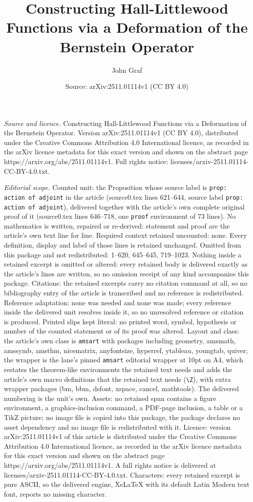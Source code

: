 \documentclass[10pt,a4paper]{amsart}
\title[Constructing Hall-Littlewood Functions via a Deformation of ]{Constructing Hall-Littlewood Functions via a Deformation of the Bernstein Operator}
\author{John Graf}
\date{Source: arXiv:2511.01114v1 (CC BY 4.0)}
\begin{document}
\maketitle

\noindent\emph{Source and licence.} Constructing Hall-Littlewood Functions via a Deformation of the Bernstein Operator. Version arXiv:2511.01114v1 (CC BY 4.0), distributed under the Creative Commons Attribution 4.0 International licence, as recorded in the arXiv licence metadata for this exact version and shown on the abstract page https://arxiv.org/abs/2511.01114v1. Full rights notice: licenses/arxiv-2511.01114-CC-BY-4.0.txt.\par\smallskip

\noindent\textit{Editorial scope.} Counted unit: the Proposition whose source label is \texttt{prop: action of adjoint} in the article (source0.tex lines 621--644, source label \texttt{prop: action of adjoint}), delivered together with the article's own complete original proof of it (source0.tex lines 646--718, one \texttt{proof} environment of 73 lines). No mathematics is written, repaired or re-derived: statement and proof are the article's own text line for line. Required context retained uncounted: none. Every definition, display and label of those lines is retained unchanged. Omitted from this package and not redistributed: 1--620, 645--645, 719--1023. Nothing inside a retained excerpt is omitted or altered: every retained body is delivered exactly as the article's lines are written, so no omission receipt of any kind accompanies this package. Citations: the retained excerpts carry no citation command at all, so no bibliography entry of the article is transcribed and no reference is redistributed. Reference adaptation: none was needed and none was made; every reference inside the delivered unit resolves inside it, so no unresolved reference or citation is produced. Printed slips kept literal: no printed word, symbol, hypothesis or number of the counted statement or of its proof was altered. Layout and class: the article's own class is \texttt{amsart} with packages including geometry, amsmath, amssymb, amsthm, nicematrix, anyfontsize, hyperref, ytableau, youngtab, quiver; the wrapper is the lane's pinned \texttt{amsart} editorial wrapper at 10pt on A4, which restates the theorem-like environments the retained text needs and adds the article's own macro definitions that the retained text needs (\texttt{\textbackslash Z}), with extra wrapper packages (bm, bbm, dsfont, xspace, cancel, mathtools). The delivered numbering is the unit's own. Assets: no retained span contains a figure environment, a graphics-inclusion command, a PDF-page inclusion, a table or a TikZ picture; no image file is copied into this package, the package declares no asset dependency and no image file is redistributed with it. Licence: version arXiv:2511.01114v1 of this article is distributed under the Creative Commons Attribution 4.0 International licence, as recorded in the arXiv licence metadata for this exact version and shown on the abstract page https://arxiv.org/abs/2511.01114v1. A full rights notice is delivered at licenses/arxiv-2511.01114-CC-BY-4.0.txt. Characters: every retained excerpt is pure ASCII, so the delivered engine, XeLaTeX with its default Latin Modern text font, reports no missing character.
\end{document}
